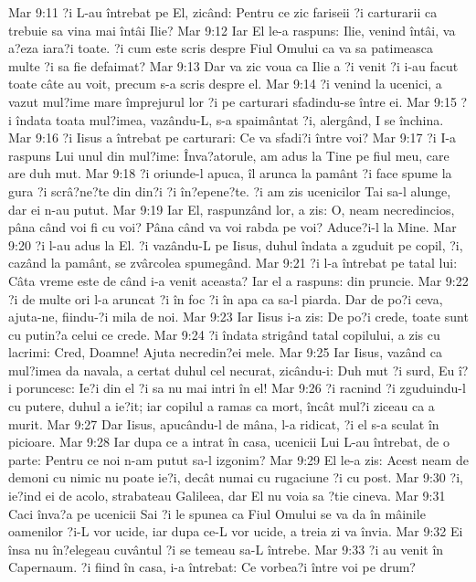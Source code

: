 Mar 9:11  ?i L-au întrebat pe El, zicând: Pentru ce zic fariseii ?i carturarii ca trebuie sa vina mai întâi Ilie?
Mar 9:12  Iar El le-a raspuns: Ilie, venind întâi, va a?eza iara?i toate. ?i cum este scris despre Fiul Omului ca va sa patimeasca multe ?i sa fie defaimat?
Mar 9:13  Dar va zic voua ca Ilie a ?i venit ?i i-au facut toate câte au voit, precum s-a scris despre el.
Mar 9:14  ?i venind la ucenici, a vazut mul?ime mare împrejurul lor ?i pe carturari sfadindu-se între ei.
Mar 9:15  ?i îndata toata mul?imea, vazându-L, s-a spaimântat ?i, alergând, I se închina.
Mar 9:16  ?i Iisus a întrebat pe carturari: Ce va sfadi?i între voi?
Mar 9:17  ?i I-a raspuns Lui unul din mul?ime: Înva?atorule, am adus la Tine pe fiul meu, care are duh mut.
Mar 9:18  ?i oriunde-l apuca, îl arunca la pamânt ?i face spume la gura ?i scrâ?ne?te din din?i ?i în?epene?te. ?i am zis ucenicilor Tai sa-l alunge, dar ei n-au putut.
Mar 9:19  Iar El, raspunzând lor, a zis: O, neam necredincios, pâna când voi fi cu voi? Pâna când va voi rabda pe voi? Aduce?i-l la Mine.
Mar 9:20  ?i l-au adus la El. ?i vazându-L pe Iisus, duhul îndata a zguduit pe copil, ?i, cazând la pamânt, se zvârcolea spumegând.
Mar 9:21  ?i l-a întrebat pe tatal lui: Câta vreme este de când i-a venit aceasta? Iar el a raspuns: din pruncie.
Mar 9:22  ?i de multe ori l-a aruncat ?i în foc ?i în apa ca sa-l piarda. Dar de po?i ceva, ajuta-ne, fiindu-?i mila de noi.
Mar 9:23  Iar Iisus i-a zis: De po?i crede, toate sunt cu putin?a celui ce crede.
Mar 9:24  ?i îndata strigând tatal copilului, a zis cu lacrimi: Cred, Doamne! Ajuta necredin?ei mele.
Mar 9:25  Iar Iisus, vazând ca mul?imea da navala, a certat duhul cel necurat, zicându-i: Duh mut ?i surd, Eu î?i poruncesc: Ie?i din el ?i sa nu mai intri în el!
Mar 9:26  ?i racnind ?i zguduindu-l cu putere, duhul a ie?it; iar copilul a ramas ca mort, încât mul?i ziceau ca a murit.
Mar 9:27  Dar Iisus, apucându-l de mâna, l-a ridicat, ?i el s-a sculat în picioare.
Mar 9:28  Iar dupa ce a intrat în casa, ucenicii Lui L-au întrebat, de o parte: Pentru ce noi n-am putut sa-l izgonim?
Mar 9:29  El le-a zis: Acest neam de demoni cu nimic nu poate ie?i, decât numai cu rugaciune ?i cu post.
Mar 9:30  ?i, ie?ind ei de acolo, strabateau Galileea, dar El nu voia sa ?tie cineva.
Mar 9:31  Caci înva?a pe ucenicii Sai ?i le spunea ca Fiul Omului se va da în mâinile oamenilor ?i-L vor ucide, iar dupa ce-L vor ucide, a treia zi va învia.
Mar 9:32  Ei însa nu în?elegeau cuvântul ?i se temeau sa-L întrebe.
Mar 9:33  ?i au venit în Capernaum. ?i fiind în casa, i-a întrebat: Ce vorbea?i între voi pe drum?
